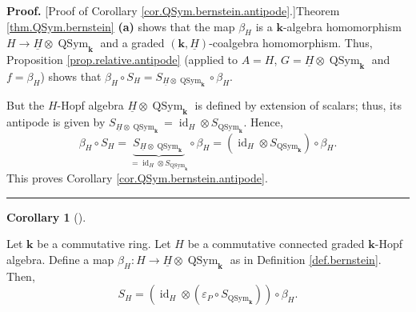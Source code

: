 \documentclass[numbers=enddot,12pt,final,onecolumn,notitlepage,abstracton]{scrartcl}%
\theoremstyle{definition}
\newtheorem{coro}[theo]{Corollary}
\newenvironment{corollary}[1][]
{\begin{coro}[#1]\begin{leftbar}}
{\end{leftbar}\end{coro}}
\newenvironment{proof}[1][Proof]{\noindent\textbf{#1.} }{\ \rule{0.5em}{0.5em}}
\begin{document}
\begin{proof}
[Proof of Corollary \ref{cor.QSym.bernstein.antipode}.]Theorem
\ref{thm.QSym.bernstein} \textbf{(a)} shows that the map $\beta_{H}$ is a
$\mathbf{k}$-algebra homomorphism $H\rightarrow\underline{H}\otimes
\operatorname*{QSym}\nolimits_{\mathbf{k}}$ and a graded $\left(
\mathbf{k},\underline{H}\right)  $-coalgebra homomorphism. Thus, Proposition
\ref{prop.relative.antipode} (applied to $A=H$, $G=\underline{H}%
\otimes\operatorname*{QSym}\nolimits_{\mathbf{k}}$ and $f=\beta_{H}$) shows
that $\beta_{H}\circ S_{H}=S_{\underline{H}\otimes\operatorname*{QSym}%
\nolimits_{\mathbf{k}}}\circ\beta_{H}$.

But the $H$-Hopf algebra $\underline{H}\otimes\operatorname*{QSym}%
\nolimits_{\mathbf{k}}$ is defined by extension of scalars; thus, its antipode
is given by $S_{\underline{H}\otimes\operatorname*{QSym}\nolimits_{\mathbf{k}%
}}=\operatorname*{id}\nolimits_{H}\otimes S_{\operatorname*{QSym}%
\nolimits_{\mathbf{k}}}$. Hence,%
\[
\beta_{H}\circ S_{H}=\underbrace{S_{\underline{H}\otimes\operatorname*{QSym}%
\nolimits_{\mathbf{k}}}}_{=\operatorname*{id}\nolimits_{H}\otimes
S_{\operatorname*{QSym}\nolimits_{\mathbf{k}}}}\circ\beta_{H}=\left(
\operatorname*{id}\nolimits_{H}\otimes S_{\operatorname*{QSym}%
\nolimits_{\mathbf{k}}}\right)  \circ\beta_{H}.
\]
This proves Corollary \ref{cor.QSym.bernstein.antipode}.
\end{proof}

\begin{corollary}
\label{cor.QSym.bernstein.antipodeH}Let $\mathbf{k}$ be a commutative ring.
Let $H$ be a commutative connected graded $\mathbf{k}$-Hopf algebra. Define a
map $\beta_{H}:H\rightarrow\underline{H}\otimes\operatorname*{QSym}%
\nolimits_{\mathbf{k}}$ as in Definition \ref{def.bernstein}. Then,%
\[
S_{H}=\left(  \operatorname*{id}\nolimits_{H}\otimes\left(  \varepsilon
_{P}\circ S_{\operatorname*{QSym}\nolimits_{\mathbf{k}}}\right)  \right)
\circ\beta_{H}.
\]

\end{corollary}
\end{document}
